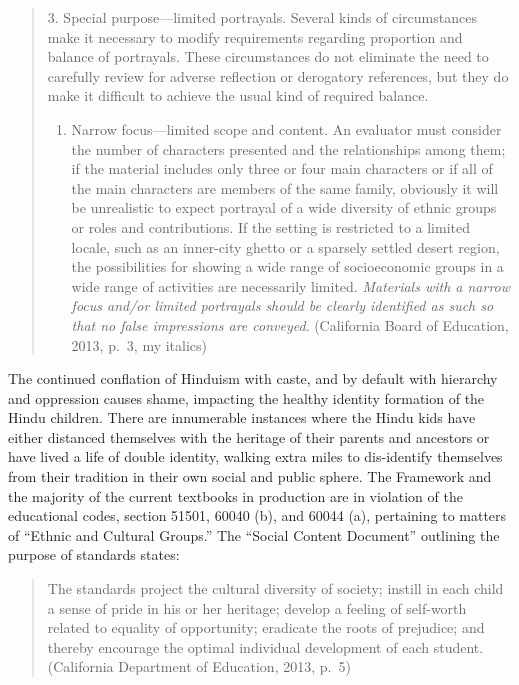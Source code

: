 \begin{quote}
3. Special purpose—limited portrayals. Several kinds of circumstances make it necessary to modify requirements regarding proportion and balance of portrayals. These circumstances do not eliminate the need to carefully review for adverse reflection or derogatory references, but they do make it difficult to achieve the usual kind of required balance.
\renewcommand{\theenumi}{\alph{enumi}}
\renewcommand{\labelenumi}{\theenumi.}
\begin{enumerate}
\item Narrow focus—limited scope and content. An evaluator must consider the number of characters presented and the relationships among them; if the material includes only three or four main characters or if all of the main characters are members of the same family, obviously it will be unrealistic to expect portrayal of a wide diversity of ethnic groups or roles and contributions. If the setting is restricted to a limited locale, such as an inner-city ghetto or a sparsely settled desert region, the possibilities for showing a wide range of socioeconomic groups in a wide range of activities are necessarily limited. \textit{Materials with a narrow focus and/or limited portrayals should be clearly identified as such so that no false impressions are conveyed}. (California Board of Education, 2013, p.\ 3, my italics) 
\end{enumerate}
\end{quote}
The continued conflation of Hinduism with caste, and by default with hierarchy and oppression causes shame, impacting the healthy identity formation of the Hindu children. There are innumerable instances where the Hindu kids have either distanced themselves with the heritage of their parents and ancestors or have lived a life of double identity, walking extra miles to dis-identify themselves from their tradition in their own social and public sphere. The Framework and the majority of the current textbooks in production are in violation of the educational codes, section 51501, 60040 (b), and 60044 (a), pertaining to matters of “Ethnic and Cultural Groups.” The “Social Content Document” outlining the purpose of standards states: 
\begin{quote}
The standards project the cultural diversity of society; instill in each child a sense of pride in his or her heritage; develop a feeling of self-worth related to equality of opportunity; eradicate the roots of prejudice; and thereby encourage the optimal individual development of each student. (California Department of Education, 2013, p.\ 5)
\end{quote}
